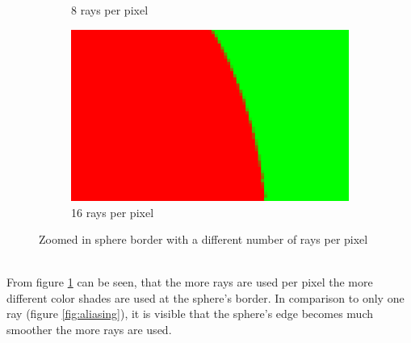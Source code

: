\documentclass[12pt]{report}
\begin{document}
\begin{figure}[h!]
\begin{subfigure}[h!]{0.475\textwidth}
\caption{8 rays per pixel}
\end{subfigure}
\hfill
\begin{subfigure}[h!]{0.475\textwidth}
\centering
\includegraphics[width=\textwidth]{step4_16rays}
\caption{16 rays per pixel}
\end{subfigure}
\caption{Zoomed in sphere border with a different number of rays per pixel}
\label{fig:step4}
\end{figure} \\
From figure \ref{fig:step4} can be seen, that the more rays are used per pixel the more different color shades are used at the sphere's border. In comparison to only one ray (figure \ref{fig:aliasing}), it is visible that the sphere's edge becomes much smoother the more rays are used.
\end{document}
